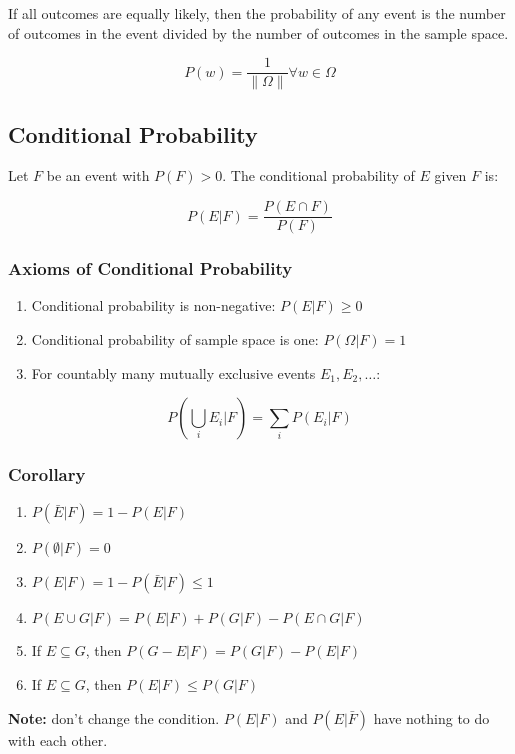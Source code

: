 If all outcomes are equally likely, then the probability of any event is the number of outcomes in the event divided by the number of outcomes in the sample space.

$$ P(w) = \frac{1}{\|\Omega\|} \forall w \in \Omega $$

\subsection*{Conditional Probability}

Let $F$ be an event with $P(F) > 0$. The conditional probability of $E$ given $F$ is:

$$ P(E|F) = \frac{P(E \cap F)}{P(F)} $$

\subsubsection*{Axioms of Conditional Probability}

\begin{enumerate}
    \item Conditional probability is non-negative: $P(E|F) \geq 0$
    \item Conditional probability of sample space is one: $P(\Omega|F) = 1$
    \item For countably many mutually exclusive events $E_1, E_2, \dots$:
\end{enumerate}

$$ P\left(\bigcup_{i} E_i|F\right) = \sum_{i} P(E_i|F) $$

\subsubsection*{Corollary}

\begin{enumerate}
    \item $P(\bar{E}|F) = 1 - P(E|F)$
    \item $P(\emptyset|F) = 0$
    \item $P(E|F) = 1 - P(\bar{E}|F) \leq 1$
    \item $P(E \cup G|F) = P(E|F) + P(G|F) - P(E \cap G|F)$
    \item If $E \subseteq G$, then $P(G-E|F)=P(G|F)-P(E|F)$
    \item If $E \subseteq G$, then $P(E|F) \leq P(G|F)$
\end{enumerate}

\textbf{Note:} don't change the condition. $P(E|F)$ and $P(E|\bar{F})$ have nothing to do with each other.

